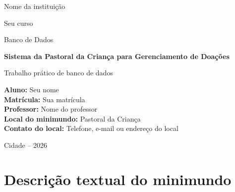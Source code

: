 ﻿\documentclass[12pt,a4paper]{article}
\newcommand{\nomeAluno}{Seu nome}
\newcommand{\matriculaAluno}{Sua matr\'icula}
\newcommand{\cursoAluno}{Seu curso}
\newcommand{\disciplina}{Banco de Dados}
\newcommand{\professor}{Nome do professor}
\newcommand{\instituicao}{Nome da institui\c{c}\~ao}
\newcommand{\tituloTrabalho}{Sistema da Pastoral da Crian\c{c}a para Gerenciamento de Doa\c{c}\~oes}
\newcommand{\localMinimundo}{Pastoral da Crian\c{c}a}
\newcommand{\contatoLocal}{Telefone, e-mail ou endere\c{c}o do local}
\newcommand{\cidadeData}{Cidade -- 2026}
\begin{document}
\begin{titlepage}
  \centering

  {\large \instituicao\par}
  \vspace{0.5cm}
  {\large \cursoAluno\par}
  \vspace{0.5cm}
  {\large \disciplina\par}

  \vfill

  {\Large \textbf{\tituloTrabalho}\par}
  \vspace{1.5cm}
  {\large Trabalho pr\'atico de banco de dados\par}

  \vfill

  \begin{flushleft}
    \textbf{Aluno:} \nomeAluno\\
    \textbf{Matr\'icula:} \matriculaAluno\\
    \textbf{Professor:} \professor\\
    \textbf{Local do minimundo:} \localMinimundo\\
    \textbf{Contato do local:} \contatoLocal
  \end{flushleft}

  \vfill

  {\large \cidadeData\par}
\end{titlepage}

\section{Descri\c{c}\~ao textual do minimundo}
\end{document}
